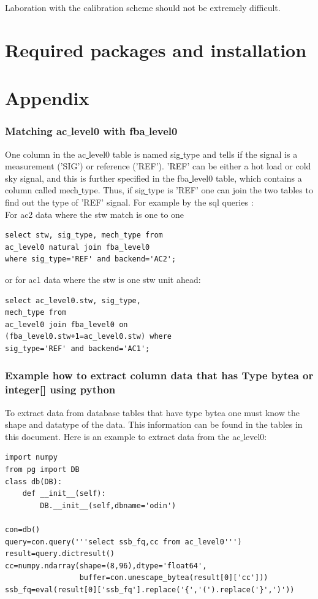 \documentclass[12pt]{article}
\begin{document}
Laboration with the calibration scheme should not be extremely
difficult.
  
\section{Required packages and installation}

\section{Appendix}
\subsubsection*{Matching ac\underline{ }level0 with fba\underline{ }level0}
 One column in the ac\underline{ }level0
table is named sig\underline{ }type and tells if the signal is 
a measurement ('SIG') or reference ('REF').
'REF' can be either a hot load or cold sky signal, and this is
further specified in the fba\underline{ }level0 table,
which contains a column called mech\underline{ }type.
Thus, if sig\underline{ }type is 'REF' one can join the two
tables to find out the type of 'REF' signal.
For example by the sql queries :\\
For ac2 data where the stw match is one to one\\
\begin{verbatim}
select stw, sig_type, mech_type from 
ac_level0 natural join fba_level0 
where sig_type='REF' and backend='AC2';
\end{verbatim}
or for ac1 data where the stw is one stw unit ahead:
\begin{verbatim}
select ac_level0.stw, sig_type,
mech_type from 
ac_level0 join fba_level0 on 
(fba_level0.stw+1=ac_level0.stw) where 
sig_type='REF' and backend='AC1';
\end{verbatim}

\subsubsection*{Example how to extract column data that has Type bytea
or integer[] using python}
To extract data from database tables that have type bytea one must
know the shape and datatype of the data. This information
can be found in the tables in this document. Here is an example
to extract data from the ac\underline{ }level0: 

\begin{verbatim}
import numpy
from pg import DB
class db(DB):
    def __init__(self):
        DB.__init__(self,dbname='odin')

con=db()
query=con.query('''select ssb_fq,cc from ac_level0''')
result=query.dictresult()
cc=numpy.ndarray(shape=(8,96),dtype='float64',
                 buffer=con.unescape_bytea(result[0]['cc']))
ssb_fq=eval(result[0]['ssb_fq'].replace('{','(').replace('}',')'))
\end{verbatim}
\clearpage
\newpage
\end{document}
